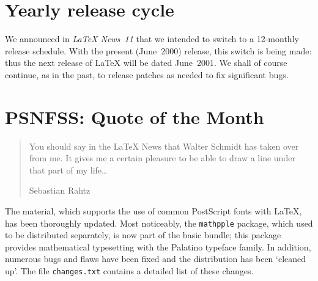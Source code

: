 \documentclass{ltnews}
\providecommand\pkg[1]{\texttt{#1}}
\providecommand\file[1]{\texttt{#1}}
\begin{document}
\maketitle

\raisefirstsection
\section{Yearly release cycle}

We announced in \textit{\LaTeX{} News~11} that we intended to switch
to a 12-monthly release schedule.  With the present (June~2000)
release, this switch is being made: thus the next release of \LaTeX{}
will be dated June~2001.  We shall of course continue, as in the past,
to release patches as needed to fix significant bugs.

  \begin{latexonly}
    \vspace{-0.2\baselineskip}
    \enlargethispage{\baselineskip}
  \end{latexonly}

\section{PSNFSS: \small Quote of the Month}

\begin{quote}
  You should say in the \LaTeX{} News that Walter Schmidt has taken over
  \PSNFSS{} from me. It gives me a certain pleasure to be able to draw a
  line under that part of my life\ldots

  \begin{latexonly}
    \vspace{-\baselineskip}
  \end{latexonly}

  \begin{flushright}
    Sebastian Rahtz
  \end{flushright}
\end{quote}

\begin{latexonly}
  \vspace{-\baselineskip}
\end{latexonly}

\noindent
The \PSNFSS{} material, which supports the use\latex{\\}
of common PostScript fonts with \LaTeX{}, has been thoroughly updated.
Most noticeably, the \pkg{mathpple} package, which used to be
distributed separately, is now part of the basic \PSNFSS{} bundle;
this package provides mathematical typesetting with the Palatino
typeface family.  In addition, numerous bugs and flaws have been fixed
and the distribution has been `cleaned up'.  The file
\file{changes.txt} contains a detailed list of these changes.
\end{document}
